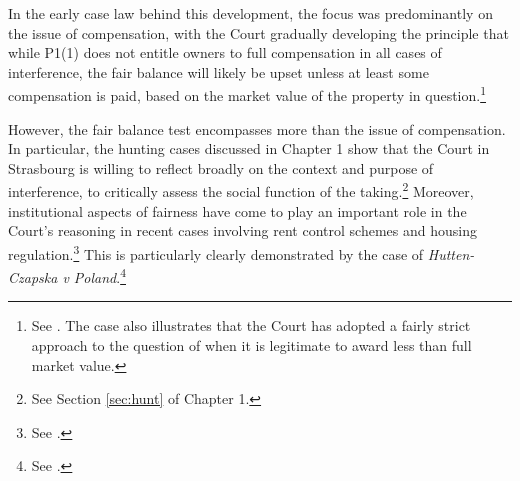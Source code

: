 In the early case law behind this development, the focus was predominantly on the issue of compensation, with the Court gradually developing the principle that while P1(1) does not entitle owners to full compensation in all cases of interference, the fair balance will likely be upset unless at least some compensation is paid, based on the market value of the property in question.\footnote{See \cite[103]{scordino06}. The case also illustrates that the Court has adopted a fairly strict approach to the question of when it is legitimate to award less than full market value.} %

However, the fair balance test encompasses more than the issue of compensation. In particular, the hunting cases discussed in Chapter 1 show that the Court in Strasbourg is willing to reflect broadly on the context and purpose of interference, to critically assess the social function of the taking.\footnote{See Section \ref{sec:hunt} of Chapter 1.} Moreover, institutional aspects of fairness have come to play an important role in the Court's reasoning in recent cases involving rent control schemes and housing regulation.\footnote{See \cite{hutten06,lindheim12}.} This is particularly clearly demonstrated by the case of {\it Hutten-Czapska v Poland}.\footnote{See \cite{hutten06}.}



